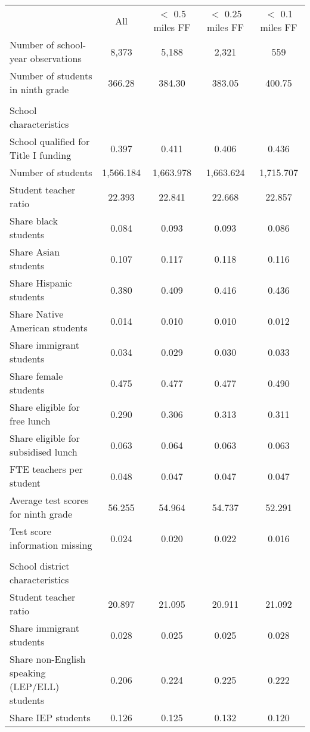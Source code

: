\begin{center}
\begin{tabular}{lcccc}
\hline \noalign{\smallskip} & All & $ < $ 0.5 miles FF & $ < $ 0.25 miles FF & $ < $ 0.1 miles FF\\
\noalign{\smallskip}\hline \noalign{\smallskip}Number of school-year observations & 8,373 & 5,188 & 2,321 & 559\\
Number of students in ninth grade & 366.28 & 384.30 & 383.05 & 400.75\\
 &  &  &  & \\
School characteristics &  &  &  & \\
School qualified for Title I funding & 0.397 & 0.411 & 0.406 & 0.436\\
Number of students & 1,566.184 & 1,663.978 & 1,663.624 & 1,715.707\\
Student teacher ratio  & 22.393 & 22.841 & 22.668 & 22.857\\
Share black students & 0.084 & 0.093 & 0.093 & 0.086\\
Share Asian students & 0.107 & 0.117 & 0.118 & 0.116\\
Share Hispanic students & 0.380 & 0.409 & 0.416 & 0.436\\
Share Native American students & 0.014 & 0.010 & 0.010 & 0.012\\
Share immigrant students & 0.034 & 0.029 & 0.030 & 0.033\\
Share female students & 0.475 & 0.477 & 0.477 & 0.490\\
Share eligible for free lunch & 0.290 & 0.306 & 0.313 & 0.311\\
Share eligible for subsidised lunch & 0.063 & 0.064 & 0.063 & 0.063\\
FTE teachers per student & 0.048 & 0.047 & 0.047 & 0.047\\
Average test scores for ninth grade  & 56.255 & 54.964 & 54.737 & 52.291\\
Test score information missing & 0.024 & 0.020 & 0.022 & 0.016\\
 &  &  &  & \\
School district characteristics &  &  &  & \\
Student teacher ratio  & 20.897 & 21.095 & 20.911 & 21.092\\
Share immigrant students & 0.028 & 0.025 & 0.025 & 0.028\\
Share non-English speaking (LEP/ELL) students & 0.206 & 0.224 & 0.225 & 0.222\\
Share IEP students & 0.126 & 0.125 & 0.132 & 0.120\\

\end{tabular}
\end{center}
